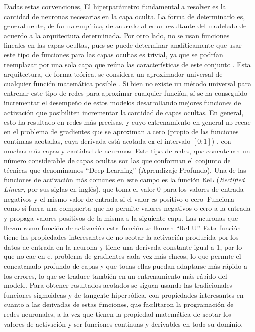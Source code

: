\documentclass[12pt, spanish]{article}
\begin{document}
Dadas estas convenciones,
El hiperparámetro fundamental a resolver es la cantidad de neuronas necesarias en
la capa oculta. La forma de determinarlo es, generalmente, de forma empírica, de
acuerdo al error resultante del modelado de
acuerdo a la arquitectura determinada. Por otro lado, no se usan funciones lineales
en las capas ocultas, pues se puede determinar analíticamente que usar este tipo de
funciones para las capas ocultas es trivial, ya que se podrían reemplazar por una
sola capa que reúna las características de este conjunto \cite{isasi2004redes}. 
Esta arquitectura, de forma teórica, se considera un aproximador universal de
cualquier función matemática posible \cite{Hornik_1989}. Si bien no existe un
método universal para entrenar este tipo de redes para aproximar cualquier función,
sí se ha conseguido incrementar el desempeño de estos modelos desarrollando mejores 
funciones de activación que posibiliten incrementar la cantidad de capas ocultas.
En general, esto ha resultado en redes más precisas, y cuyo entrenamiento en general
no recae en el problema de gradientes que se aproximan a cero (propio de las funciones continuas acotadas,
cuya derivada está acotada en el intervalo $[0;1]$) \cite{Bengio_1994}, con
muchas más capas y cantidad de neuronas.
Este tipo de redes, que concatenan un número considerable de capas ocultas
son las que conforman el conjunto de técnicas que denominamos ``Deep Learning''
(Aprendizaje Profundo). Una de las funciones de activación más comunes en este
campo es la función ReL (\textit{Rectified Linear}, por sus siglas en inglés),
que toma el valor 0 para los valores de entrada negativos y el mismo valor de
entrada si el valor es positivo o cero. Funciona como si fuera una compuerta
que no permite valores negativos o cero a la entrada y propaga valores positivos
de la misma a la siguiente capa. Las neuronas que llevan como función de activación
esta función se llaman ``ReLU''. Esta función tiene las
propiedades interesantes de no acotar la activación producida por los datos de
entrada en la neurona y tiene una derivada constante igual a 1, por lo que no cae en el
problema de gradientes cada vez más chicos, lo que permite el concatenado profundo
de capas y que todas ellas puedan adaptarse más rápido a los errores, lo que
se traduce también en un entrenamiento más rápido del modelo. Para obtener
resultados acotados se siguen usando las tradicionales funciones sigmoideas y de
tangente hiperbólica, con propiedades interesantes en cuanto a las derivadas de
estas funciones, que facilitaron la programación de redes neuronales, a la vez
que tienen la propiedad matemática de acotar los valores de activación y ser
funciones continuas y derivables en todo su dominio.
\end{document}
